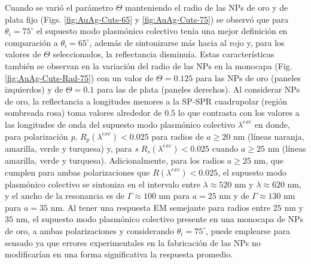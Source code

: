 Cuando se varió el parámetro $\Theta$ manteniendo el radio de las NPs de oro y de plata fijo (Figs. \ref{fig:AuAg-Cuts-65} y \ref{fig:AuAg-Cuts-75}) se observó que para $\theta_i=75^\circ$  el supuesto modo plasmónico colectivo tenía una mejor definición en comparación a $\theta_i =65^\circ$, además de sintonizarse más hacia al rojo y, para los valores de $\Theta$ seleccionados, la reflectancia disminuía. Estas características también se observan en la variación del radio de las NPs en la monocapa (Fig. \ref{fig:AuAg-Cuts-Rad-75})  con un valor de $\Theta=0.125$ para las NPs de oro (paneles izquierdos) y de $\Theta=0.1$ para las de plata (paneles derechos). Al considerar NPs de oro, la reflectancia a longitudes menores a la SP-SPR cuadrupolar (región sombreada rosa) toma valores alrededor de $0.5$  lo que contrasta con los valores a las longitudes de onda del supuesto modo plasmónico colectivo $\lambda^{exc}$ en donde, para polarización \emph{p}, $R_p(\lambda^{exc})<0.025$ para radios de $a\geq 20$ nm (líneas naranja, amarilla, verde y turquesa) y, para \emph{s} $R_s(\lambda^{exc})<0.025$ cuando $a\geq 25$ nm (líneas amarilla, verde y turquesa). Adicionalmente, para los radios  $a\geq 25$ nm, que cumplen para ambas polarizaciones que $R(\lambda^{exc})<0.025$, el supuesto modo plasmónico colectivo se sintoniza en el intervalo entre $\lambda\approx 520$ nm y $\lambda\approx 620$ nm, y el ancho de la resonancia es de $\Gamma \approx 100$ nm para $a=25$ nm y de $\Gamma\approx 130$ nm para $a=35$ nm. Al tener una respuesta EM semejante para radios entre $25$ nm y $35$ nm, el supuesto modo plasmónico colectivo presente en una monocapa de NPs de oro, a ambas polarizaciones y considerando $\theta_i=75^\circ$, puede emplearse para sensado ya que errores experimentales en la fabricación de las NPs no modificarían en una forma significativa la respuesta promedio.



